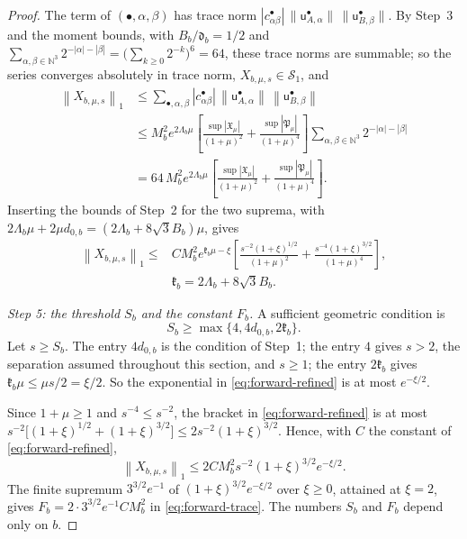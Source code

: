 \documentclass[11pt]{amsart}
\numberwithin{equation}{section}
\theoremstyle{definition}
\newcommand{\N}{\mathbb N}
\newcommand{\Sc}{\mathcal S}
\newcommand{\norm}[1]{\left\|#1\right\|}
\begin{document}
\begin{proof}
The term of \((\bullet,\alpha,\beta)\) has trace norm
\(|c^\bullet_{\alpha\beta}|\,\lVert\mathsf u^\bullet_{A,\alpha}\rVert\,
\lVert\mathsf u^\bullet_{B,\beta}\rVert\). By Step~3 and the moment bounds,
with \(B_b/\mathfrak d_b=1/2\) and
\(\sum_{\alpha,\beta\in\N^3}2^{-|\alpha|-|\beta|}
=\bigl(\sum_{k\ge0}2^{-k}\bigr)^6=64\), these trace norms are summable;
so the series converges absolutely in trace norm,
\(X_{b,\mu,s}\in\Sc_1\), and
\[
 \begin{split}
 \norm{X_{b,\mu,s}}_1
 &\le\sum_{\bullet,\alpha,\beta}|c^\bullet_{\alpha\beta}|\,
 \norm{\mathsf u^\bullet_{A,\alpha}}\,\norm{\mathsf u^\bullet_{B,\beta}}\\
 &\le M_b^2e^{2\Lambda_b\mu}
 \left[\frac{\sup|\mathfrak X_\mu|}{(1+\mu)^2}
 +\frac{\sup|\mathfrak P_\mu|}{(1+\mu)^4}\right]
 \sum_{\alpha,\beta\in\N^3}2^{-|\alpha|-|\beta|}\\
 &=64\,M_b^2e^{2\Lambda_b\mu}
 \left[\frac{\sup|\mathfrak X_\mu|}{(1+\mu)^2}
 +\frac{\sup|\mathfrak P_\mu|}{(1+\mu)^4}\right].
 \end{split}
\]
Inserting the bounds of Step~2 for the two suprema, with
\(2\Lambda_b\mu+2\mu d_{0,b}=(2\Lambda_b+8\sqrt3B_b)\mu\), gives
\begin{equation}
 \begin{split}
 \norm{X_{b,\mu,s}}_1
 \le{}&CM_b^2e^{\mathfrak k_b\mu-\xi}
 \left[
 \frac{s^{-2}(1+\xi)^{1/2}}{(1+\mu)^2}
 +\frac{s^{-4}(1+\xi)^{3/2}}{(1+\mu)^4}
 \right],\\
 &\mathfrak k_b=2\Lambda_b+8\sqrt3B_b.
 \end{split}
 \label{eq:forward-refined}
\end{equation}

\smallskip
\emph{Step 5: the threshold \(S_b\) and the constant \(F_b\).}
A sufficient geometric condition is
\begin{equation}
 S_b\ge\max\{4,4d_{0,b},2\mathfrak k_b\}.
 \label{eq:forward-geometry}
\end{equation}
Let \(s\ge S_b\). The entry \(4d_{0,b}\) is the condition of Step~1;
the entry \(4\) gives \(s>2\), the separation assumed throughout this
section, and \(s\ge1\); the entry \(2\mathfrak k_b\) gives
\(\mathfrak k_b\mu\le\mu s/2=\xi/2\). So the exponential in
\eqref{eq:forward-refined} is at most \(e^{-\xi/2}\).

Since \(1+\mu\ge1\) and \(s^{-4}\le s^{-2}\), the bracket in
\eqref{eq:forward-refined} is at most
\(s^{-2}\bigl[(1+\xi)^{1/2}+(1+\xi)^{3/2}\bigr]\le2s^{-2}(1+\xi)^{3/2}\).
Hence, with \(C\) the constant of \eqref{eq:forward-refined},
\[
 \norm{X_{b,\mu,s}}_1\le2CM_b^2s^{-2}(1+\xi)^{3/2}e^{-\xi/2}.
\]
The finite supremum \(3^{3/2}e^{-1}\) of \((1+\xi)^{3/2}e^{-\xi/2}\)
over \(\xi\ge0\), attained at \(\xi=2\), gives
\(F_b={2\cdot3^{3/2}e^{-1}CM_b^2}\) in \eqref{eq:forward-trace}. The
numbers \(S_b\) and \(F_b\) depend only on \(b\).


\end{proof}
\end{document}
